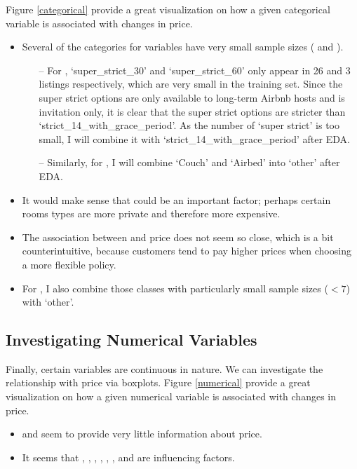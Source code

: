 \documentclass[11pt]{article}
\begin{document}
Figure \ref{categorical} provide a great visualization on how a given categorical variable is associated with changes in price. 
\begin{itemize}
    \item Several of the categories for variables have very small sample sizes ( and ). 
    \begin{itemize}
        \item[--]  For , `super\_strict\_30' and `super\_strict\_60' only appear in 26 and 3 listings respectively, which are very small in the training set. Since the super strict options are only available to long-term Airbnb hosts and is invitation only, it is clear that the super strict options are stricter than `strict\_14\_with\_grace\_period'. As the number of `super strict' is too small, I will combine it with `strict\_14\_with\_grace\_period' after EDA.
        \item[--] Similarly, for , I will combine `Couch' and `Airbed' into `other' after EDA. 
    \end{itemize}
    \item It would make sense that  could be an important factor; perhaps certain rooms types are more private and therefore more expensive.
    \item The association between  and price does not seem so close, which is a bit counterintuitive, because customers tend to pay higher prices when choosing a more flexible policy.
    \item For , I also combine those classes with particularly small sample sizes ($< 7$) with `other'.
\end{itemize} 

\subsection{Investigating Numerical Variables}
Finally, certain variables are continuous in nature. We can investigate the relationship with price via boxplots. Figure \ref{numerical} provide a great visualization on how a given numerical variable is associated with changes in price. 


\begin{itemize}
    \item {} and  seem to provide very little information about price. 
    \item It seems that , , , , , , and  are influencing factors. 
\end{itemize}
\end{document}
